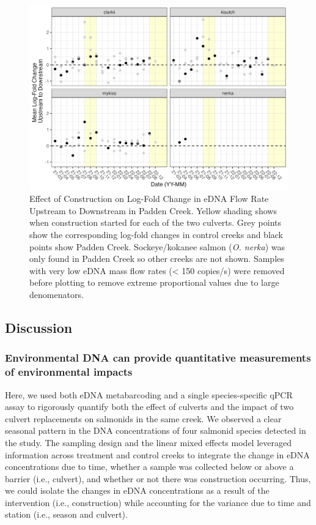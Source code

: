 \documentclass[
]{article}
\begin{document}
\begin{figure}
\centering
\includegraphics{../Output/Figures/culvert_padden_controls.png}
\caption{Effect of Construction on Log-Fold Change in eDNA Flow Rate
Upstream to Downstream in Padden Creek. Yellow shading shows when
construction started for each of the two culverts. Grey points show the
corresponding log-fold changes in control creeks and black points show
Padden Creek. Sockeye/kokanee salmon (\emph{O. nerka}) was only found in
Padden Creek so other creeks are not shown. Samples with very low eDNA
mass flow rates (\textless{} 150 copies/s) were removed before plotting
to remove extreme proportional values due to large
denomenators.\label{fig:construction}}
\end{figure}

\hypertarget{discussion}{%
\subsection{Discussion}\label{discussion}}

\hypertarget{environmental-dna-can-provide-quantitative-measurements-of-environmental-impacts}{%
\subsubsection{Environmental DNA can provide quantitative measurements
of environmental
impacts}\label{environmental-dna-can-provide-quantitative-measurements-of-environmental-impacts}}

Here, we used both eDNA metabarcoding and a single species-specific qPCR
assay to rigorously quantify both the effect of culverts and the impact
of two culvert replacements on salmonids in the same creek. We observed
a clear seasonal pattern in the DNA concentrations of four salmonid
species detected in the study. The sampling design and the linear mixed
effects model leveraged information across treatment and control creeks
to integrate the change in eDNA concentrations due to time, whether a
sample was collected below or above a barrier (i.e., culvert), and
whether or not there was construction occurring. Thus, we could isolate
the changes in eDNA concentrations as a result of the intervention
(i.e., construction) while accounting for the variance due to time and
station (i.e., season and culvert).
\end{document}
